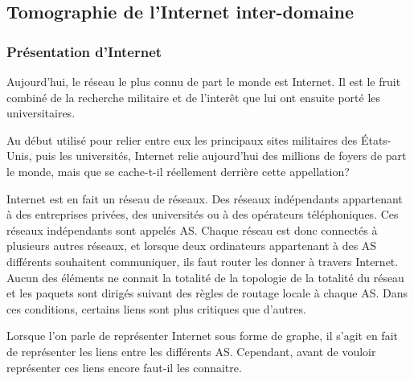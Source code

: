 
% 

\subsection{Tomographie de l'Internet inter-domaine}

\subsubsection{Pr\'esentation d'Internet}

\par
Aujourd'hui, le r\'eseau le plus connu de part le monde est Internet. Il est le fruit combin\'e de la recherche militaire et de l'inter\^et que lui ont ensuite port\'e les universitaires.
\par
Au d\'ebut utilis\'e pour relier entre eux les principaux sites militaires des \'Etats-Unis, puis les universit\'es, Internet relie aujourd'hui des millions de foyers de part le monde, mais que se cache-t-il r\'eellement derri\`ere cette appellation?
\par
Internet est en fait un r\'eseau de r\'eseaux. Des r\'eseaux ind\'ependants appartenant \`a des entreprises priv\'ees, des universit\'es ou à des op\'erateurs t\'el\'ephoniques. Ces r\'eseaux ind\'ependants sont appel\'es AS. Chaque r\'eseau est donc connect\'es \`a plusieurs autres r\'eseaux, et lorsque deux ordinateurs appartenant \`a des AS diff\'erents souhaitent communiquer, ils faut router les donner \`a travers Internet. Aucun des \'el\'ements ne connait la totalit\'e de la topologie de la totalit\'e du r\'eseau et les paquets sont dirig\'es suivant des r\`egles de routage locale \`a chaque AS. Dans ces conditions, certains liens sont plus critiques que d'autres.
\par
Lorsque l'on parle de repr\'esenter Internet sous forme de graphe, il s'agit en fait de repr\'esenter les liens entre les diff\'erents AS. Cependant, avant de vouloir repr\'esenter ces liens encore faut-il les connaitre.

